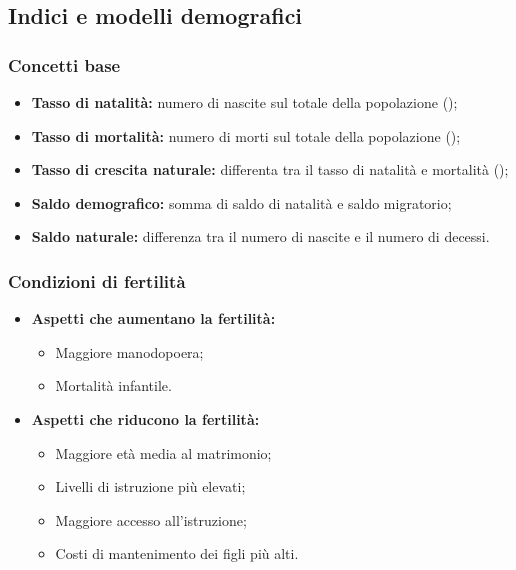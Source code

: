 \documentclass{article}
\begin{document}
\subsection{Indici e modelli demografici}
\subsubsection{Concetti base}
\begin{itemize}
    \item \textbf{Tasso di natalità:} numero di nascite sul totale della popolazione (\textperthousand);
    \item \textbf{Tasso di mortalità:} numero di morti sul totale della popolazione (\textperthousand);
    \item \textbf{Tasso di crescita naturale:} differenta tra il tasso di natalità e mortalità (\textperthousand);
    \item \textbf{Saldo demografico:} somma di saldo di natalità e saldo migratorio;
    \item \textbf{Saldo naturale:} differenza tra il numero di nascite e il numero di decessi.
\end{itemize}

\subsubsection{Condizioni di fertilità}
\begin{itemize}
    \item \textbf{Aspetti che aumentano la fertilità:}
        \begin{itemize}[label=$\circ$]
            \item Maggiore manodopoera;
            \item Mortalità infantile.
        \end{itemize}
    \item \textbf{Aspetti che riducono la fertilità:}
        \begin{itemize}[label=$\circ$]
            \item Maggiore età media al matrimonio;
            \item Livelli di istruzione più elevati;
            \item Maggiore accesso all'istruzione;
            \item Costi di mantenimento dei figli più alti.
        \end{itemize}
\end{itemize}
\end{document}
